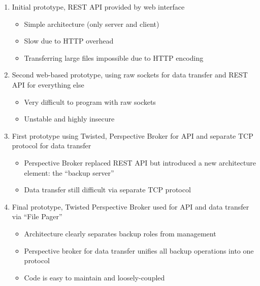 \begin{enumerate}
    \item Initial prototype, REST API provided by web interface
        \begin{itemize}
            \item Simple architecture (only server and client)
            \item Slow due to HTTP overhead
            \item Transferring large files impossible due to HTTP encoding
        \end{itemize}
    \item Second web-based prototype, using raw sockets for data transfer and
        REST API for everything else
        \begin{itemize}
            \item Very difficult to program with raw sockets
            \item Unstable and highly insecure
        \end{itemize}
    \item First prototype using Twisted, Perspective Broker for API and
        separate TCP protocol for data transfer
        \begin{itemize}
            \item Perspective Broker replaced REST API but introduced a new
                architecture element: the ``backup server''
            \item Data transfer still difficult via separate TCP protocol
        \end{itemize}
    \item Final prototype, Twisted Perspective Broker used for API and data
        transfer via ``File Pager''
        \begin{itemize}
            \item Architecture clearly separates backup roles from management
            \item Perspective broker for data transfer unifies all backup
                operations into one protocol
            \item Code is easy to maintain and loosely-coupled
        \end{itemize}
\end{enumerate}
